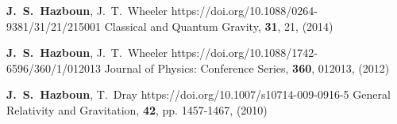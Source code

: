          {\textbf{J.~S.~Hazboun}, J.~T.~Wheeler}
         {https://doi.org/10.1088/0264-9381/31/21/215001}
         {{Classical and Quantum Gravity}, \textbf{31}, 21, (2014)}

         {\textbf{J.~S.~Hazboun}, J.~T.~{Wheeler}}
         {https://doi.org/10.1088/1742-6596/360/1/012013}
         {{Journal of Physics: Conference Series}, \textbf{360}, 012013, (2012)}

         {\textbf{J.~S.~Hazboun}, T.~{Dray}}
         {https://doi.org/10.1007/s10714-009-0916-5}
         {{General Relativity and Gravitation}, \textbf{42}, pp. 1457-1467, (2010)}

